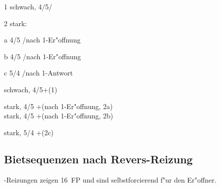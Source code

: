   \begin{compactitem}
  \item[1] schwach, 4/5\pl \ofa/\tr
  \item[2] stark:
    \begin{compactitem}
    \item[a] 4/5 \ofa/\tr nach 1\tre-Er"offnung
    \item[b] 4/5 \ofa/\ka nach 1\kar-Er"offnung
    \item[c] 5/4 \pi/\co nach 1\pik-Antwort
    \end{compactitem}
  \end{compactitem}

  \bdsc
  \item[pass] schwach, 4/5\pl \pi{}+\tr (1)
  \item[3\kar] stark, 4/5 \pi{}+\tr (nach 1\tre-Er"offnung, 2a) \\
    stark, 4/5 \pi{}+\ka (nach 1\kar-Er"offnung, 2b)
  \item[3\coe] stark, 5/4 \pi{}+\co (2c)
  \edsc
\edsc

\subsection{Bietsequenzen nach Revers-Reizung}

-Reizungen zeigen 16\good{}\pl~FP und sind selbstforcierend f"ur den
Er"offner.

\bdsc
  \item[1\tre{}\sep1\pik; 2\kar{}\sep{}?]~

